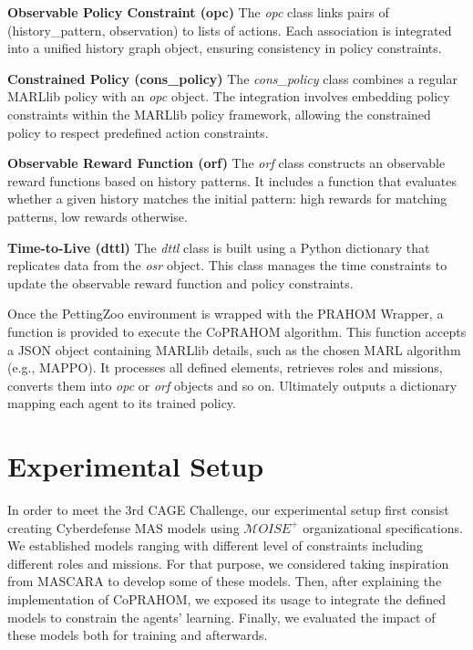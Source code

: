 \documentclass[conference]{IEEEtran}
\begin{document}
\textbf{Observable Policy Constraint (opc)} \quad The \textit{opc} class links pairs of (history\_pattern, observation) to lists of actions. Each association is integrated into a unified history graph object, ensuring consistency in policy constraints.

\textbf{Constrained Policy (cons\_policy)} \quad The \textit{cons\_policy} class combines a regular MARLlib policy with an \textit{opc} object. The integration involves embedding policy constraints within the MARLlib policy framework, allowing the constrained policy to respect predefined action constraints.

\textbf{Observable Reward Function (orf)} \quad The \textit{orf} class constructs an observable reward functions based on history patterns. It includes a function that evaluates whether a given history matches the initial pattern: high rewards for matching patterns, low rewards otherwise.

\textbf{Time-to-Live (dttl)} \quad The \textit{dttl} class is built using a Python dictionary that replicates data from the \textit{osr} object. This class manages the time constraints to update the observable reward function and policy constraints.

Once the PettingZoo environment is wrapped with the PRAHOM Wrapper, a function is provided to execute the CoPRAHOM algorithm. This function accepts a JSON object containing MARLlib details, such as the chosen MARL algorithm (e.g., MAPPO). It processes all defined elements, retrieves roles and missions, converts them into \textit{opc} or \textit{orf} objects and so on. Ultimately outputs a dictionary mapping each agent to its trained policy.


\section{Experimental Setup}\label{sec:experimental_setup}

In order to meet the 3rd CAGE Challenge, our experimental setup first consist creating Cyberdefense MAS models using $\mathcal{M}OISE^+$ organizational specifications. We established models ranging with different level of constraints including different roles and missions. For that purpose, we considered taking inspiration from MASCARA to develop some of these models. Then, after explaining the implementation of CoPRAHOM, we exposed its usage to integrate the defined models to constrain the agents' learning. Finally, we evaluated the impact of these models both for training and afterwards.
\end{document}

